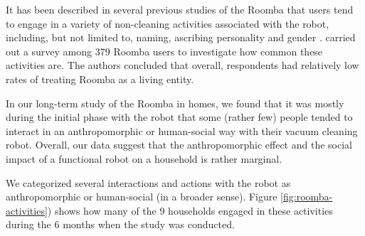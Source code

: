 \documentclass{frontiersSCNS} %
\begin{document}
It has been described in several previous studies of the Roomba that users tend
to engage in a variety of non-cleaning activities associated with the robot,
including, but not limited to, naming, ascribing personality and gender
\citep{forlizzi_service_2006,forlizzi_how_2007,krumm_my_2007,sung_domestic_2010}.
\cite{sung_housewives_2008} carried out a survey among 379 Roomba users to
investigate how common these activities are. The authors concluded that overall,
respondents had relatively low rates of treating Roomba as a living entity.  

In our long-term study of the Roomba in homes, we found that it was mostly
during the initial phase with the robot that some (rather few) people tended to
interact in an anthropomorphic or human-social way with their vacuum cleaning
robot.  Overall, our data suggest that the anthropomorphic effect and the social
impact of a functional robot on a household is rather marginal.

We categorized several interactions and actions with the robot as
anthropomorphic or human-social (in a broader sense). 
Figure \ref{fig:roomba-activities}) shows how many of the 9 households engaged
in these activities during the 6 months when the study was conducted. 
\end{document}
